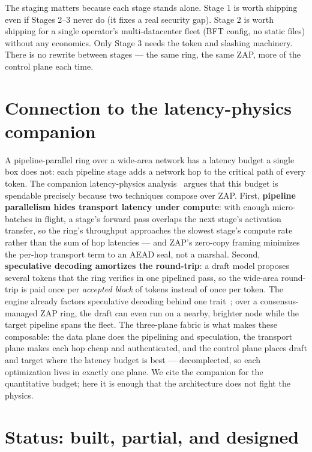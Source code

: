 \documentclass[11pt]{article}
\begin{document}
The staging matters because each stage stands alone. Stage 1 is worth shipping even if Stages
2--3 never do (it fixes a real security gap). Stage 2 is worth shipping for a single operator's
multi-datacenter fleet (BFT config, no static files) without any economics. Only Stage 3 needs
the token and slashing machinery. There is no rewrite between stages --- the same ring, the same
ZAP, more of the control plane each time.

\section{Connection to the latency-physics companion}
\label{sec:latency}

A pipeline-parallel ring over a wide-area network has a latency budget a single box does not: each
pipeline stage adds a network hop to the critical path of every token. The companion
latency-physics analysis~\cite{latency} argues that this budget is spendable precisely because
two techniques compose over ZAP. First, \textbf{pipeline parallelism hides transport latency
under compute}: with enough micro-batches in flight, a stage's forward pass overlaps the next
stage's activation transfer, so the ring's throughput approaches the slowest stage's compute rate
rather than the sum of hop latencies --- and ZAP's zero-copy framing minimizes the per-hop
transport term to an AEAD seal, not a marshal. Second, \textbf{speculative decoding amortizes the
round-trip}: a draft model proposes several tokens that the ring verifies in one pipelined pass,
so the wide-area round-trip is paid once per \emph{accepted block} of tokens instead of once per
token. The engine already factors speculative decoding behind one 
trait~\cite{infstack}; over a consensus-managed ZAP ring, the draft can even run on a nearby,
brighter node while the target pipeline spans the fleet. The three-plane fabric is what makes
these composable: the data plane does the pipelining and speculation, the transport plane makes
each hop cheap and authenticated, and the control plane places draft and target where the latency
budget is best --- decomplected, so each optimization lives in exactly one plane. We cite the
companion for the quantitative budget; here it is enough that the architecture does not fight the
physics.

\section{Status: built, partial, and designed}
\label{sec:status}
\end{document}
